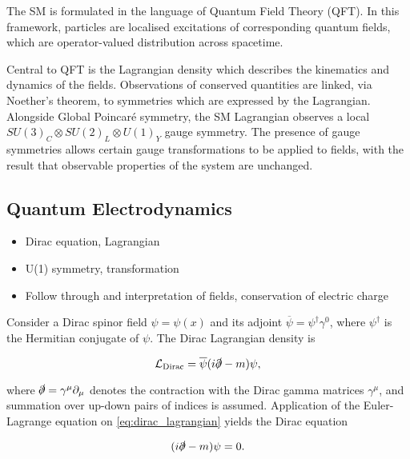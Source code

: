 The SM is formulated in the language of Quantum Field Theory (QFT).
In this framework, particles are localised excitations of corresponding quantum fields, which are operator-valued distribution across spacetime.

Central to QFT is the Lagrangian density which describes the kinematics and dynamics of the fields.
Observations of conserved quantities are linked, via Noether's theorem, to symmetries which are expressed by the Lagrangian.
Alongside Global Poincar\'e symmetry, the SM Lagrangian observes a local $SU(3)_C \otimes SU(2)_L \otimes U(1)_Y$ gauge symmetry.
The presence of gauge symmetries allows certain gauge transformations to be applied to fields, with the result that observable properties of the system are unchanged.



\subsection{Quantum Electrodynamics}\label{sec:qed}

\begin{itemize}
  \item Dirac equation, Lagrangian
  \item U(1) symmetry, transformation
  \item Follow through and interpretation of fields, conservation of electric charge
\end{itemize}

Consider a Dirac spinor field $\psi = \psi(x)$ and its adjoint $\overline{\psi} = \psi^\dagger \gamma^0$, where $\psi^\dagger$ is the Hermitian conjugate of $\psi$.
The Dirac Lagrangian density is

\begin{equation}\label{eq:dirac_lagrangian}
  \mathcal{L}_{\textnormal{Dirac}} = \overline{\psi} (i \slashed{\partial}  - m )\psi,
\end{equation}

where $\slashed{\partial} = \gamma^\mu \partial_\mu$ denotes the contraction with the Dirac gamma matrices $\gamma^\mu$, and summation over up-down pairs of indices is assumed.
Application of the Euler-Lagrange equation on \cref{eq:dirac_lagrangian} yields the Dirac equation

\begin{equation}\label{eq:dirac_eq}
  (i \slashed{\partial}  - m )\psi = 0.
\end{equation}

